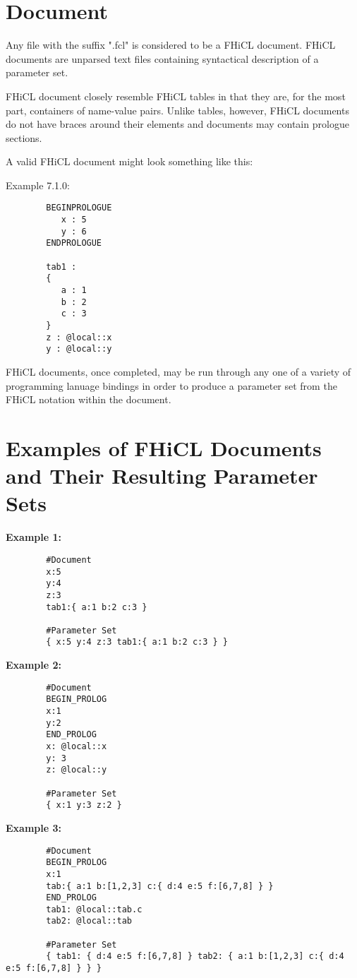 \documentclass{memarticle}
\begin{document}
\chapter{Document}
	Any file with the suffix ".fcl" is considered to be a FHiCL document.
	FHiCL documents are unparsed text files containing syntactical description of a parameter set.
	\par
	FHiCL document closely resemble FHiCL tables in that they are, for the most part,
	containers of name-value pairs.
	Unlike tables, however, FHiCL documents do not have braces around their elements
	and documents may contain prologue sections.
	\par
	A valid FHiCL document might look something like this:
	\par
	Example 7.1.0:
	\begin{verbatim}
		BEGINPROLOGUE
		   x : 5
		   y : 6
		ENDPROLOGUE
		
		tab1 :
		{
		   a : 1
		   b : 2
		   c : 3
   		}
		z : @local::x
		y : @local::y
	\end{verbatim}
	\par
	FHiCL documents, once completed, may be run through any one of a variety of programming lanuage bindings
	in order to produce a parameter set from the FHiCL notation within the document.
\chapter{Examples of FHiCL Documents and Their Resulting Parameter Sets}
	\textbf{Example 1:}	
	\begin{verbatim}
		#Document
		x:5
		y:4
		z:3
		tab1:{ a:1 b:2 c:3 }
	
		#Parameter Set
		{ x:5 y:4 z:3 tab1:{ a:1 b:2 c:3 } }
	\end{verbatim}

	\textbf{Example 2:}
	\begin{verbatim}
		#Document
		BEGIN_PROLOG
		x:1
		y:2
		END_PROLOG
		x: @local::x
		y: 3
		z: @local::y
	
		#Parameter Set
		{ x:1 y:3 z:2 }
	\end{verbatim}

	\textbf{Example 3:}
	\begin{verbatim}
		#Document
		BEGIN_PROLOG
		x:1
		tab:{ a:1 b:[1,2,3] c:{ d:4 e:5 f:[6,7,8] } }
		END_PROLOG
		tab1: @local::tab.c
		tab2: @local::tab

		#Parameter Set
		{ tab1: { d:4 e:5 f:[6,7,8] } tab2: { a:1 b:[1,2,3] c:{ d:4 e:5 f:[6,7,8] } } }
	\end{verbatim}
\end{document}
